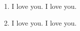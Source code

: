 \begin{enumerate}
  \item I love you.
        I love you.
  \item I love you.
        I love you.
\end{enumerate}

